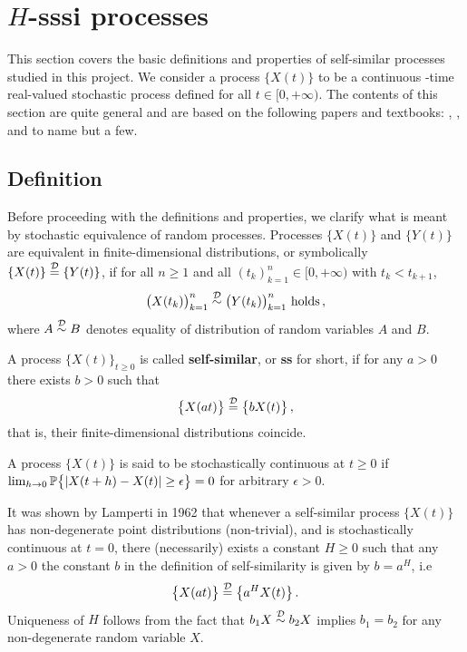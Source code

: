 \section{$H$-sssi processes} %
\label{sec:h_sssi_processes}

This section covers the basic definitions and properties of self-similar processes
studied in this project. We consider a process $\bigl\{X(t)\bigr\}$ to be a continuous
-time real-valued stochastic process defined for all $t\in [0,+\infty)$. The contents
of this section are quite general and are based on the following papers and textbooks:
\cite{bulinskii2005teoriya2516755}, \cite{Bai20141710}, \cite{Chronopoulou:1114288}
\cite{embrechts2000introduction} and \cite{embrechtsselfsimilar} to name but a few.

\subsection{Definition} %
\label{sub:definition}

Before proceeding with the definitions and properties, we clarify what is meant by
stochastic equivalence of random processes. Processes $\bigl\{X(t)\bigr\}$ and
$\bigl\{Y(t)\bigr\}$ are equivalent in finite-dimensional distributions, or symbolically
$\{X(t)\} \overset{\mathcal{D}}{=} \{Y(t)\}$, if for all $n\geq1$ and all $(t_k)_{k=1}^n\in [0,+\infty)$
with $t_k<t_{k+1}$,
\[ \bigl(X(t_k)\bigr)_{k=1}^n \overset{\mathcal{D}}{\sim} \bigl(Y(t_k)\bigr)_{k=1}^n \text{ holds}\,,\]
where $A\overset{\mathcal{D}}{\sim} B$ denotes equality of distribution of random variables
$A$ and $B$.

A process $\bigl\{X(t)\bigr\}_{t\geq 0}$ is called \textbf{self-similar}, or \textbf{ss}
for short, if for any $a>0$ there exists $b>0$ such that
\[ \bigl\{X(at)\bigr\} \overset{\mathcal{D}}{=} \bigl\{b X(t)\bigr\} \,,\]
that is, their finite-dimensional distributions coincide.

A process $\bigl\{X(t)\bigr\}$ is said to be stochastically continuous at $t\geq0$ if
$\lim_{h\to 0} \mathbb{P}\bigl\{ |X(t+h)-X(t)| \geq \epsilon \bigr\} = 0$ for arbitrary
$\epsilon > 0$.

It was shown by Lamperti in 1962 that whenever a self-similar process $\bigl\{X(t)\bigr\}$
has non-degenerate point distributions (non-trivial), and is stochastically continuous
at $t=0$, there (necessarily) exists a constant $H\geq 0$ such that any $a>0$ the constant
$b$ in the definition of self-similarity is given by $b=a^H$, i.e
\[ \bigl\{X(at)\bigr\} \overset{\mathcal{D}}{=} \bigl\{a^H X(t)\bigr\} \,. \]
Uniqueness of $H$ follows from the fact that $b_1 X\overset{\mathcal{D}}{\sim} b_2 X$ implies
$b_1=b_2$ for any non-degenerate random variable $X$.

